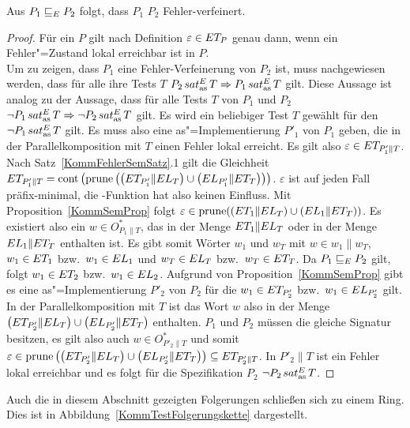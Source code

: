 \begin{Satz}
  \label{KommTestVerfSatz}
  Aus $P_1 \sqsubseteq  _E P_2$ folgt, dass $P_1$ $P_2$ Fehler-verfeinert.
\end{Satz}
\begin{proof}
  Für ein \MEIO{} $P$ gilt nach Definition $\varepsilon\in ET _P$ genau dann,
  wenn ein Fehler"=Zustand lokal erreichbar ist in $P$.\\
  Um zu zeigen, dass $P_1$ eine Fehler-Verfeinerung von $P_2$ ist, muss
  nachgewiesen werden, dass für alle ihre Tests $T$ $P_2\hspace{0.05cm}sat_\mathrm{as}^E\hspace{0.05cm} T \Rightarrow
  P_1\hspace{0.05cm}sat_\mathrm{as}^E\hspace{0.05cm} T$ gilt. Diese Aussage ist analog zu der Aussage, dass für alle
  Tests $T$ von $P_1$ und $P_2$ $\neg P_1\hspace{0.05cm}sat_\mathrm{as}^E\hspace{0.05cm} T \Rightarrow \neg P_2\hspace{0.05cm}sat_\mathrm{as}^E\hspace{0.05cm}
  T$ gilt. Es wird ein beliebiger Test $T$ gewählt für den $\neg P_1 \hspace{0.05cm}sat_\mathrm{as}^E\hspace{0.05cm} T$
  gilt. Es muss also eine as"=Implementierung $P'_1$ von $P_1$ geben, die in
  der Parallelkomposition mit $T$ einen Fehler lokal erreicht. Es gilt also
  $\varepsilon\in ET _{P'_1\|T}$. Nach Satz~\ref{KommFehlerSemSatz}.1 gilt die
  Gleichheit $ET _{P'_1\|T} = \mathrm{cont} \left(\mathrm{prune} \left(\left(ET _{P'_1}\|EL
  _T\right)\cup \left(EL _{P'_1}\|ET _T\right)\right)\right)$. $\varepsilon$
  ist auf jeden Fall präfix-minimal, die \cont{}-Funktion hat also keinen
  Einfluss. Mit Proposition~\ref{KommSemProp} folgt $\varepsilon \in \mathrm{prune}
  ((ET _1\|EL _T)\cup (EL _1\|ET _T))$. Es existiert also ein $w\in
  O_{P_1\|T}^*$, das in der Menge $ET _1\|EL _T$ oder in der Menge $EL
  _1\|ET _T$ enthalten ist. Es gibt somit Wörter $w_1$ und $w_T$ mit $w\in
  w_1\|w_T$, $w_1\in ET _1$ bzw.\ $w_1\in EL _1$ und $w_T\in EL _T$ bzw.\ $w_T
  \in ET _T$. Da $P_1 \sqsubseteq  _E P_2$ gilt, folgt $w_1\in ET _2$ bzw.\ $w_1\in EL
  _2$. Aufgrund von Proposition~\ref{KommSemProp} gibt es eine
  as"=Implementierung $P'_2$ von $P_2$ für die $w_1\in ET _{P'_2}$ bzw.\
  $w_1\in EL _{P'_2}$ gilt. In der Parallelkomposition mit $T$ ist das Wort $w$
  also in der Menge $\left(ET _{P'_2}\|EL _T\right)\cup \left(EL
  _{P'_2}\|ET _T\right)$ enthalten. $P_1$ und $P_2$ müssen die gleiche
  Signatur besitzen, es gilt also auch $w\in O_{P'_2\|T}^*$ und somit
  $\varepsilon\in\mathrm{prune} \left(\left(ET _{P'_2}\|EL _T\right)\cup \left(EL
  _{P'_2}\|ET _T\right)\right) \subseteq ET _{P'_2\|T}$. In $P'_2\|T$ ist ein
  Fehler lokal erreichbar und es folgt für die Spezifikation $P_2$ $\neg P_2
  \hspace{0.05cm}sat_\mathrm{as}^E\hspace{0.05cm} T$.
\end{proof}

Auch die in diesem Abschnitt gezeigten Folgerungen schließen sich zu einem
Ring. Dies ist in Abbildung~\ref{KommTestFolgerungskette} dargestellt.

